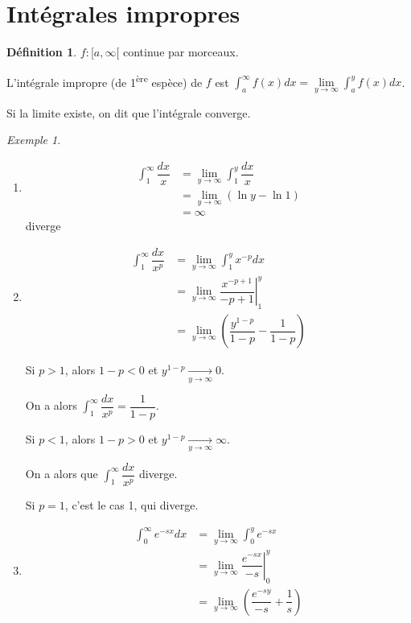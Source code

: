 \documentclass{report}
\theoremstyle{definition}
\newtheorem*{defin}{D\'efinition}
\theoremstyle{remark}
\newtheorem*{exem}{Exemple}
\begin{document}
	\section{Int\'egrales impropres}
	\begin{defin}
		$f:[a,\infty[$ continue par morceaux.

		L'int\'egrale impropre (de 1\textsuperscript{\`ere} esp\`ece) de $f$ est $\displaystyle\int_{a}^{\infty}f(x)dx = \lim\limits_{y \to \infty}\displaystyle\int_{a}^{y}f(x)dx$.

		Si la limite existe, on dit que l'int\'egrale converge.
		\begin{exem}~

			\begin{enumerate}
				\item \begin{align*}
					\int_{1}^{\infty}\dfrac{dx}{x}&= \lim_{y \to \infty}\int_{1}^{y}\dfrac{dx}{x}\\
					&= \lim_{y \to \infty}(\ln y - \ln1)\\
					&= \infty
				\end{align*}
				diverge
				\item \begin{align*}
					\int_{1}^{\infty}\dfrac{dx}{x^p}&= \lim_{y \to \infty}\int_{1}^{y}x^{-p}dx\\
					&= \left. \lim_{y \to \infty}\dfrac{x^{-p+1}}{-p+1}\right| ^y_1\\
					&= \lim_{y \to \infty}\left( \dfrac{y^{1-p}}{1-p} - \dfrac{1}{1-p} \right)
				\end{align*}

				Si $p>1$, alors $1-p<0$ et $y^{1-p} \xrightarrow[y \to \infty]{} 0$.

				On a alors $\displaystyle\int_{1}^{\infty}\dfrac{dx}{x^p} = \dfrac{1}{1-p}$.

				Si $p<1$, alors $1-p>0$ et $y^{1-p} \xrightarrow[y \to \infty]{} \infty$.

				On a alors que $\displaystyle\int_{1}^{\infty}\dfrac{dx}{x^p}$ diverge.

				Si $p=1$, c'est le cas 1, qui diverge.
				\item \begin{align*}
					\int_{0}^{\infty}e^{-sx}dx&= \lim_{y \to \infty}\int_{0}^{y}e^{-sx}\\
					&= \left. \lim_{y \to \infty}\dfrac{e^{-sx}}{-s}\right|^y_0\\
					&= \lim_{y \to \infty}\left( \dfrac{e^{-sy}}{-s} + \dfrac{1}{s} \right)
				\end{align*}


\end{enumerate}
\end{exem}
\end{defin}
\end{document}
